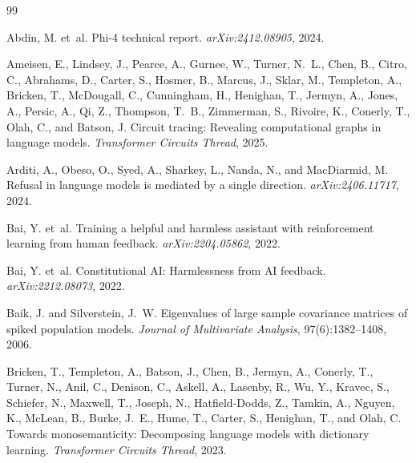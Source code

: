 \documentclass{article}
\begin{document}
\newpage

\begin{thebibliography}{99}
\small

Abdin, M. et~al.
\newblock Phi-4 technical report.
\newblock \emph{arXiv:2412.08905}, 2024.

Ameisen, E., Lindsey, J., Pearce, A., Gurnee, W., Turner, N.~L.,
 Chen, B., Citro, C., Abrahams, D., Carter, S., Hosmer, B.,
 Marcus, J., Sklar, M., Templeton, A., Bricken, T., McDougall, C.,
 Cunningham, H., Henighan, T., Jermyn, A., Jones, A., Persic, A.,
 Qi, Z., Thompson, T.~B., Zimmerman, S., Rivoire, K., Conerly, T.,
 Olah, C., and Batson, J.
\newblock Circuit tracing: Revealing computational graphs in language models.
\newblock \emph{Transformer Circuits Thread}, 2025.

Arditi, A., Obeso, O., Syed, A., Sharkey, L., Nanda, N., and
 MacDiarmid, M.
\newblock Refusal in language models is mediated by a single direction.
\newblock \emph{arXiv:2406.11717}, 2024.

Bai, Y. et~al.
\newblock Training a helpful and harmless assistant with reinforcement
 learning from human feedback.
\newblock \emph{arXiv:2204.05862}, 2022.

Bai, Y. et~al.
\newblock Constitutional {AI}: Harmlessness from {AI} feedback.
\newblock \emph{arXiv:2212.08073}, 2022.

{}
Baik, J. and Silverstein, J.~W.
\newblock Eigenvalues of large sample covariance matrices of spiked
 population models.
\newblock \emph{Journal of Multivariate Analysis}, 97(6):1382--1408, 2006.

Bricken, T., Templeton, A., Batson, J., Chen, B., Jermyn, A.,
 Conerly, T., Turner, N., Anil, C., Denison, C., Askell, A.,
 Lasenby, R., Wu, Y., Kravec, S., Schiefer, N., Maxwell, T.,
 Joseph, N., Hatfield-Dodds, Z., Tamkin, A., Nguyen, K.,
 McLean, B., Burke, J.~E., Hume, T., Carter, S., Henighan, T., and
 Olah, C.
\newblock Towards monosemanticity: Decomposing language models with
 dictionary learning.
\newblock \emph{Transformer Circuits Thread}, 2023.


\end{thebibliography}
\end{document}
